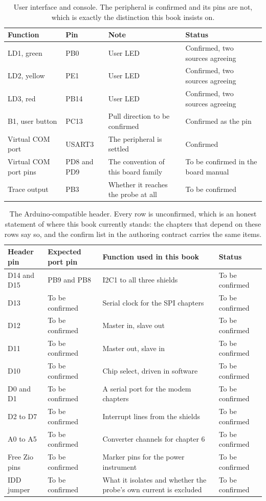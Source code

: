 \begin{table}[H]\centering\small
\begin{tabular}{p{34mm}p{30mm}p{44mm}p{42mm}}
\toprule
Function & Pin & Note & Status \\
\midrule
LD1, green & PB0 & User LED & Confirmed, two sources agreeing \\
LD2, yellow & PE1 & User LED & Confirmed, two sources agreeing \\
LD3, red & PB14 & User LED & Confirmed, two sources agreeing \\
B1, user button & PC13 & Pull direction to be confirmed & Confirmed as the pin \\
Virtual COM port & USART3 & The peripheral is settled & Confirmed \\
Virtual COM port pins & PD8 and PD9 & The convention of this board family & To be confirmed in the board manual \\
Trace output & PB3 & Whether it reaches the probe at all & To be confirmed \\
\bottomrule
\end{tabular}
\caption{User interface and console. The peripheral is confirmed and its pins are not, which is exactly the distinction this book insists on.}
\end{table}

\begin{table}[H]\centering\small
\begin{tabular}{p{26mm}p{26mm}p{50mm}p{48mm}}
\toprule
Header pin & Expected port pin & Function used in this book & Status \\
\midrule
D14 and D15 & PB9 and PB8 & I2C1 to all three shields & To be confirmed \\
D13 & To be confirmed & Serial clock for the SPI chapters & To be confirmed \\
D12 & To be confirmed & Master in, slave out & To be confirmed \\
D11 & To be confirmed & Master out, slave in & To be confirmed \\
D10 & To be confirmed & Chip select, driven in software & To be confirmed \\
D0 and D1 & To be confirmed & A serial port for the modem chapters & To be confirmed \\
D2 to D7 & To be confirmed & Interrupt lines from the shields & To be confirmed \\
A0 to A5 & To be confirmed & Converter channels for chapter 6 & To be confirmed \\
Free Zio pins & To be confirmed & Marker pins for the power instrument & To be confirmed \\
IDD jumper & To be confirmed & What it isolates and whether the probe's own current is excluded & To be confirmed \\
\bottomrule
\end{tabular}
\caption{The Arduino-compatible header. Every row is unconfirmed, which is an honest statement of where this book currently stands: the chapters that depend on these rows say so, and the confirm list in the authoring contract carries the same items.}
\end{table}

